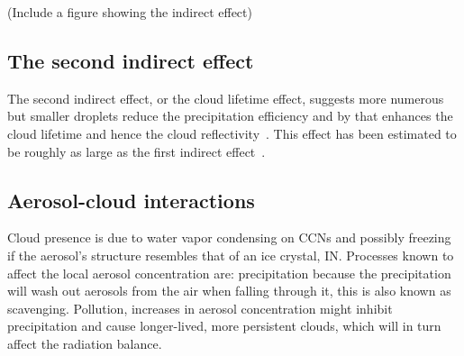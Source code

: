 (Include a figure showing the indirect effect)

\subsection{The second indirect effect}

The second indirect effect, or the cloud lifetime effect, suggests more numerous but smaller droplets reduce the precipitation efficiency and by that enhances the cloud lifetime and hence the cloud reflectivity~\citep{Albrecht1989}. This effect has been estimated to be roughly as large as the first indirect effect~\citep{Lohmann2005}.

\subsection{Aerosol-cloud interactions}

Cloud presence is due to water vapor condensing on CCNs and possibly freezing if the aerosol's structure resembles that of an ice crystal, IN. Processes known to affect the local aerosol concentration are: precipitation because the precipitation will wash out aerosols from the air when falling through it, this is also known as scavenging. Pollution, increases in aerosol concentration might inhibit precipitation and cause longer-lived, more persistent clouds, which will in turn affect the radiation balance.


 